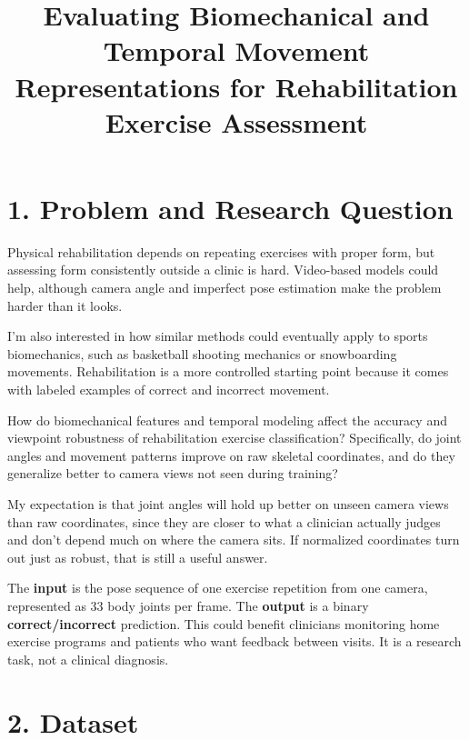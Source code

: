 

\title{Evaluating Biomechanical and Temporal Movement Representations for Rehabilitation Exercise Assessment}


\maketitle

\section{1. Problem and Research Question}

Physical rehabilitation depends on repeating exercises with proper form, but assessing form consistently outside a clinic is hard. Video-based models could help, although camera angle and imperfect pose estimation make the problem harder than it looks.

I'm also interested in how similar methods could eventually apply to sports biomechanics, such as basketball shooting mechanics or snowboarding movements. Rehabilitation is a more controlled starting point because it comes with labeled examples of correct and incorrect movement.

 How do biomechanical features and temporal modeling affect the accuracy and viewpoint robustness of rehabilitation exercise classification? Specifically, do joint angles and movement patterns improve on raw skeletal coordinates, and do they generalize better to camera views not seen during training?

My expectation is that joint angles will hold up better on unseen camera views than raw coordinates, since they are closer to what a clinician actually judges and don't depend much on where the camera sits. If normalized coordinates turn out just as robust, that is still a useful answer.

The \textbf{input} is the pose sequence of one exercise repetition from one camera, represented as 33 body joints per frame. The \textbf{output} is a binary \textbf{correct/incorrect} prediction. This could benefit clinicians monitoring home exercise programs and patients who want feedback between visits. It is a research task, not a clinical diagnosis.

\section{2. Dataset}


